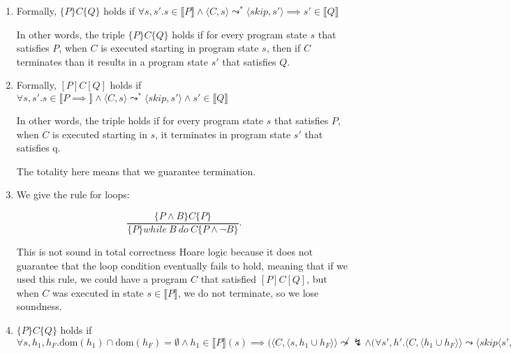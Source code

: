 


\begin{enumerate}[label=(\alph*)]

  \item

    Formally, $\{P\}C\{Q\}$ holds if $\forall s, s'.  s \in \llbracket P \rrbracket \wedge \langle C, s \rangle \leadsto^* \langle skip, s'\rangle \implies s' \in \llbracket Q \rrbracket$

    In other words, the triple $\{P\}C\{Q\}$ holds if for every program state $s$ that satisfies $P$, when $C$ is executed starting in program state $s$, then if $C$ terminates than it results in a program state $s'$ that satisfies $Q$.

  \item
    Formally, $[P]C[Q]$ holds if $\forall s, s'.  s \in \llbracket P  \implies \rrbracket \wedge \langle C, s \rangle \leadsto^* \langle skip, s'\rangle \wedge s' \in \llbracket Q \rrbracket$

    In other words, the triple holds if for every program state $s$ that satisfies $P$, when $C$ is executed starting in $s$, it terminates in program state $s'$ that satisfies q.

    The totality here means that we guarantee termination.

    \item

      We give the rule for loops:

      \[
        \frac{\{P \wedge B\}C\{P\}}{\{P\}while\ B\ do\ C\{P \wedge \neg B\}}
      .\] 

      This is not sound in total correctness Hoare logic because it does not guarantee that the loop condition eventually fails to hold, meaning that if we used this rule, we could have a program $C$ that satisfied $[P]C[Q]$, but when $C$ was executed in state $s \in \llbracket P \rrbracket$, we do not terminate, so we lose soundness.

      \item

        $\{P\}C\{Q\}$ holds if $\forall s,h_1, h_F. \text{dom}(h_1) \cap \text{dom}(h_F) = \emptyset \wedge h_1 \in \llbracket P \rrbracket(s) \implies (\langle C, \langle s, h_1 \cup h_F \rangle \rangle \not \leadsto \lightning \wedge (\forall s', h'. \langle C, \langle h_1 \cup h_F \rangle \rangle \leadsto \langle skip \langle s', h' \rangle \implies .\exists h_1'.h_1' \cup h_F = h' \wedge h_1' \in \llbracket Q \rrbracket(s)$


\end{enumerate}
